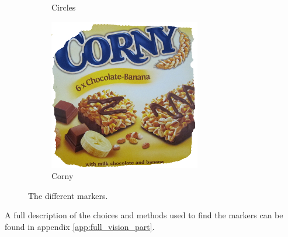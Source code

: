 \begin{figure}[h]
\begin{subfigure}[b]{0.3\linewidth}
 \caption{Circles}
 \label{marker:circle}
 \end{subfigure}
 \begin{subfigure}[b]{0.3\linewidth}
 \centering
 \includegraphics[width=\linewidth]{graphics/Marker3}
 \caption{Corny}
 \label{marker:corny}
 \end{subfigure}
 \caption{The different markers.}
 \label{fig:markers}
\end{figure}

A full description of the choices and methods used to find the markers can be found in appendix \ref{app:full_vision_part}.